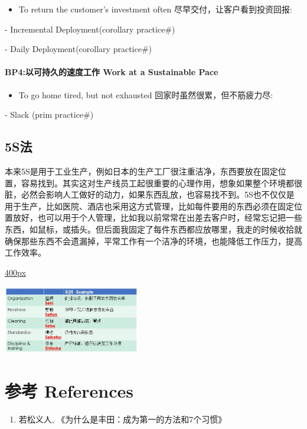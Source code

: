 \begin{itemize}
\tightlist
\item
  To return the customer's investment often
  尽早交付，让客户看到投资回报:
\end{itemize}

\begin{description}
\tightlist
\item[]
- Incremental Deployment(corollary practice\#)

- Daily Deployment(corollary practice\#)
\end{description}

\hypertarget{bp4ux4ee5ux53efux6301ux4e45ux7684ux901fux5ea6ux5de5ux4f5c-work-at-a-sustainable-pace}{%
\paragraph{BP4:以可持久的速度工作 Work at a Sustainable
Pace}\label{bp4ux4ee5ux53efux6301ux4e45ux7684ux901fux5ea6ux5de5ux4f5c-work-at-a-sustainable-pace}}

\begin{itemize}
\tightlist
\item
  To go home tired, but not exhausted 回家时虽然很累，但不筋疲力尽:\\
\end{itemize}

\begin{description}
\tightlist
\item[]
- Slack (prim practice\#)
\end{description}

\hypertarget{sux6cd5}{%
\subsection{5S法}\label{sux6cd5}}

本来5S是用于工业生产，例如日本的生产工厂很注重洁净，东西要放在固定位置，容易找到。其实这对生产线员工起很重要的心理作用，想象如果整个环境都很脏，必然会影响人工做好的动力，如果东西乱放，也容易找不到。5S也不仅仅是用于生产，比如医院、酒店也采用这方式管理，比如每件要用的东西必须在固定位置放好，也可以用于个人管理，比如我以前常常在出差去客户时，经常忘记把一些东西，如鼠标，或插头。但后面我固定了每件东西都应放哪里，我走的时候收拾就确保那些东西不会遗漏掉，平常工作有一个洁净的环境，也能降低工作压力，提高工作效率。

\href{文件:5S_五常法_Screenshot_2023-08-03_211606.jpg}{400px}

\includegraphics[width=6cm]{5S_五常法_Screenshot_2023-08-03_211606.jpg}\\

\hypertarget{ux53c2ux8003-references}{%
\section{参考 References}\label{ux53c2ux8003-references}}

\begin{enumerate}
\tightlist
\item
  若松义人, 《为什么是丰田：成为第一的方法和7个习惯》
\end{enumerate}


